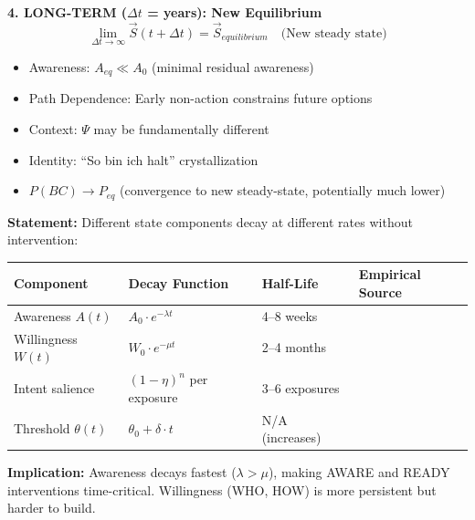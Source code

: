 \documentclass[11pt, a4paper]{article}
\begin{document}
\begin{tcolorbox}[colback=blue!5!white, colframe=blue!75!black,
    title=\textbf{Axiom NTM-A1: Four Time Horizons of Natural Dynamics}]
\vspace{0.5em}
\textbf{4. LONG-TERM ($\Delta t$ = years): New Equilibrium}
\begin{equation}
\lim_{\Delta t \to \infty} \vec{S}(t + \Delta t) = \vec{S}_{equilibrium} \quad \text{(New steady state)}
\end{equation}
\begin{itemize}[nosep]
\item Awareness: $A_{eq} \ll A_0$ (minimal residual awareness)
\item Path Dependence: Early non-action constrains future options
\item Context: $\Psi$ may be fundamentally different
\item Identity: ``So bin ich halt'' crystallization
\item $P(BC) \to P_{eq}$ (convergence to new steady-state, potentially much lower)
\end{itemize}

\end{tcolorbox}

\begin{tcolorbox}[colback=green!5!white, colframe=green!75!black,
    title=\textbf{Theorem NTM-T1: Natural Trajectory Decay Rates by Component}]

\textbf{Statement:} Different state components decay at different rates without intervention:

\begin{center}
\renewcommand{\arraystretch}{1.3}
\begin{tabular}{@{}llll@{}}
\toprule
\textbf{Component} & \textbf{Decay Function} & \textbf{Half-Life} & \textbf{Empirical Source} \\
\midrule
Awareness $A(t)$ & $A_0 \cdot e^{-\lambda t}$ & 4--8 weeks & \citet{gabaix2019behavioral, sims2003implications} \\
Willingness $W(t)$ & $W_0 \cdot e^{-\mu t}$ & 2--4 months & \citet{loewenstein2009present, ariely2002procrastination} \\
Intent salience & $(1-\eta)^n$ per exposure & 3--6 exposures & \citet{wood2016psychology, bordalo2012salience} \\
Threshold $\theta(t)$ & $\theta_0 + \delta \cdot t$ & N/A (increases) & \citet{akerlof1991procrastination, odonoghue2001choice} \\
\bottomrule
\end{tabular}
\end{center}

\textbf{Implication:} Awareness decays fastest ($\lambda > \mu$), making AWARE and READY interventions time-critical. Willingness (WHO, HOW) is more persistent but harder to build.

\end{tcolorbox}
\end{document}

